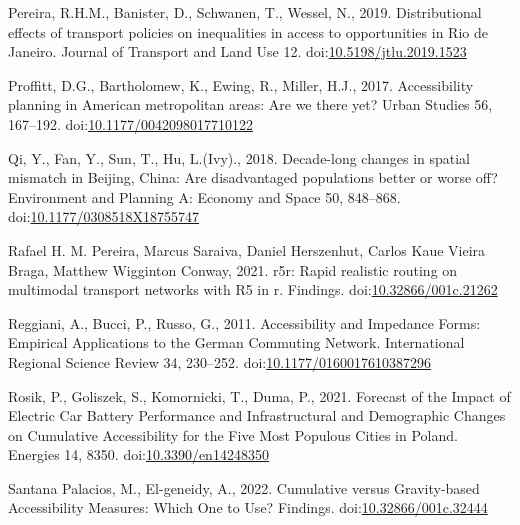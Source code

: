 \documentclass[]{elsarticle} %
\newlength{\cslhangindent}
\newlength{\cslentryspacingunit} %
\newenvironment{CSLReferences}[2] %
 {%
  \setlength{\parindent}{0pt}
  \ifodd #1
  \let\oldpar\par
  \def\par{\hangindent=\cslhangindent\oldpar}
  \fi
  \setlength{\parskip}{#2\cslentryspacingunit}
 }%
 {}
\begin{document}
\begin{CSLReferences}{1}{0}
\leavevmode{}%
Pereira, R.H.M., Banister, D., Schwanen, T., Wessel, N., 2019.
Distributional effects of transport policies on inequalities in access
to opportunities in {Rio} de {Janeiro}. Journal of Transport and Land
Use 12.
doi:\href{https://doi.org/10.5198/jtlu.2019.1523}{10.5198/jtlu.2019.1523}

\leavevmode{}%
Proffitt, D.G., Bartholomew, K., Ewing, R., Miller, H.J., 2017.
Accessibility planning in American metropolitan areas: Are we there yet?
Urban Studies 56, 167--192.
doi:\href{https://doi.org/10.1177/0042098017710122}{10.1177/0042098017710122}

\leavevmode{}%
Qi, Y., Fan, Y., Sun, T., Hu, L.(Ivy)., 2018. Decade-long changes in
spatial mismatch in {Beijing}, {China}: {Are} disadvantaged populations
better or worse off? Environment and Planning A: Economy and Space 50,
848--868.
doi:\href{https://doi.org/10.1177/0308518X18755747}{10.1177/0308518X18755747}

\leavevmode{}%
Rafael H. M. Pereira, Marcus Saraiva, Daniel Herszenhut, Carlos Kaue
Vieira Braga, Matthew Wigginton Conway, 2021. r5r: Rapid realistic
routing on multimodal transport networks with R5 in r. Findings.
doi:\href{https://doi.org/10.32866/001c.21262}{10.32866/001c.21262}

\leavevmode{}%
Reggiani, A., Bucci, P., Russo, G., 2011. Accessibility and {Impedance}
{Forms}: {Empirical} {Applications} to the {German} {Commuting}
{Network}. International Regional Science Review 34, 230--252.
doi:\href{https://doi.org/10.1177/0160017610387296}{10.1177/0160017610387296}

\leavevmode{}%
Rosik, P., Goliszek, S., Komornicki, T., Duma, P., 2021. Forecast of the
{Impact} of {Electric} {Car} {Battery} {Performance} and
{Infrastructural} and {Demographic} {Changes} on {Cumulative}
{Accessibility} for the {Five} {Most} {Populous} {Cities} in {Poland}.
Energies 14, 8350.
doi:\href{https://doi.org/10.3390/en14248350}{10.3390/en14248350}

\leavevmode{}%
Santana Palacios, M., El-geneidy, A., 2022. Cumulative versus
Gravity-based Accessibility Measures: Which One to Use? Findings.
doi:\href{https://doi.org/10.32866/001c.32444}{10.32866/001c.32444}


\end{CSLReferences}
\end{document}
